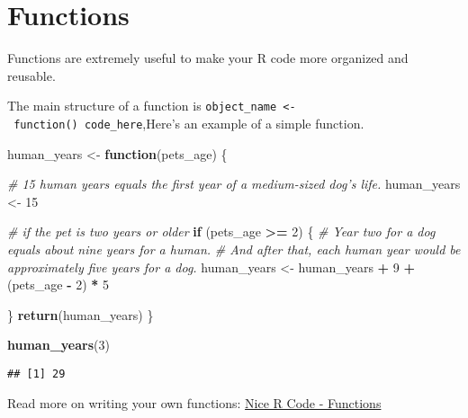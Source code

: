 \documentclass[]{book}
\newenvironment{Shaded}{\begin{snugshade}}{\end{snugshade}}
\newcommand{\CommentTok}[1]{\textcolor[rgb]{0.56,0.35,0.01}{\textit{#1}}}
\newcommand{\ControlFlowTok}[1]{\textcolor[rgb]{0.13,0.29,0.53}{\textbf{#1}}}
\newcommand{\DecValTok}[1]{\textcolor[rgb]{0.00,0.00,0.81}{#1}}
\newcommand{\KeywordTok}[1]{\textcolor[rgb]{0.13,0.29,0.53}{\textbf{#1}}}
\newcommand{\NormalTok}[1]{#1}
\newcommand{\OperatorTok}[1]{\textcolor[rgb]{0.81,0.36,0.00}{\textbf{#1}}}
\newcommand{\StringTok}[1]{\textcolor[rgb]{0.31,0.60,0.02}{#1}}
\begin{document}
\hypertarget{functions}{%
\section{Functions}\label{functions}}

Functions are extremely useful to make your R code more organized and reusable.

The main structure of a function is \texttt{object\_name\ \textless{}-\ function()\ code\_here},Here's an example of a simple function.

\begin{Shaded}
\begin{Highlighting}[]
\NormalTok{human_years <-}\StringTok{ }\ControlFlowTok{function}\NormalTok{(pets_age) \{}

  \CommentTok{# 15 human years equals the first year of a medium-sized dog's life.}
\NormalTok{  human_years <-}\StringTok{ }\DecValTok{15}
  
  \CommentTok{# if the pet is two years or older}
  \ControlFlowTok{if}\NormalTok{ (pets_age }\OperatorTok{>=}\StringTok{ }\DecValTok{2}\NormalTok{) \{}
    \CommentTok{# Year two for a dog equals about nine years for a human.}
    \CommentTok{# And after that, each human year would be approximately five years for a dog.}
\NormalTok{    human_years <-}\StringTok{ }\NormalTok{human_years }\OperatorTok{+}\StringTok{ }\DecValTok{9} \OperatorTok{+}\StringTok{ }\NormalTok{(pets_age }\OperatorTok{-}\StringTok{ }\DecValTok{2}\NormalTok{) }\OperatorTok{*}\StringTok{ }\DecValTok{5}
    
\NormalTok{  \} }
  \KeywordTok{return}\NormalTok{(human_years)}
\NormalTok{\}}

\KeywordTok{human_years}\NormalTok{(}\DecValTok{3}\NormalTok{)}
\end{Highlighting}
\end{Shaded}

\begin{verbatim}
## [1] 29
\end{verbatim}

\begin{Shaded}
\end{Shaded}

Read more on writing your own functions: \href{https://nicercode.github.io/guides/functions/}{Nice R Code - Functions}
\end{document}
